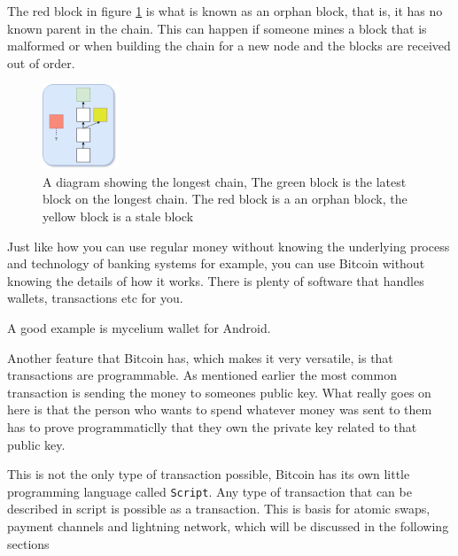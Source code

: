 The red block in figure \ref{fig:blockchain2} is what is known as an orphan
block, that is, it has no known parent in the chain. This can happen if someone
mines a block that is malformed or when building the chain for a new node and
the blocks are received out of order.

\begin{figure}[H]
	\centering
	\includegraphics[width=0.2\textwidth]{introduction/images/more_blockchain.png}
	\caption{A diagram showing the longest chain, The green block is the latest
	block on the longest chain. The red block is a an orphan block, the yellow
	block is a stale block}
	\label{fig:blockchain2}
\end{figure}


Just like how you can use regular money without knowing the underlying process
and technology of banking systems for example, you can use Bitcoin without
knowing the details of how it works. There is plenty of software that handles
wallets, transactions etc for you.

A good example is mycelium wallet for Android.

Another feature that Bitcoin has, which makes it very versatile, is that transactions are programmable.
As mentioned earlier the most
common transaction is sending the money to someones public key. What really
goes on here is that the person who wants to spend whatever money was sent to
them has to prove programmaticlly that they own the private key related to that
public key.

This is not the only type of transaction possible, Bitcoin has its own little
programming language called \texttt{Script}. Any type of transaction that can
be described in script is possible as a transaction. This is basis for atomic swaps, payment channels and lightning network, which will be discussed in the following sections
